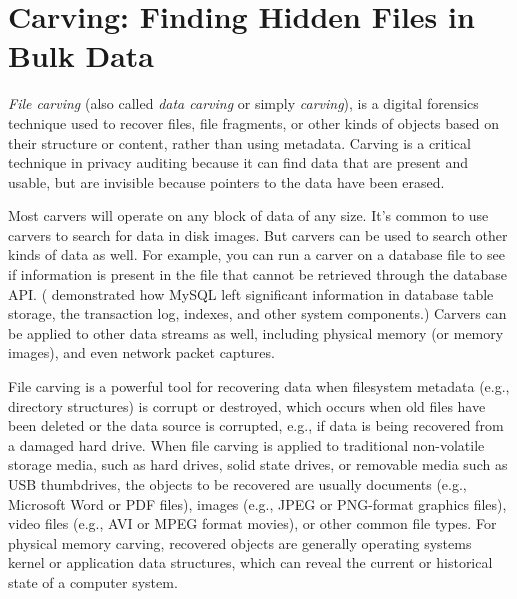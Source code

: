 \chapter{Carving: Finding Hidden Files in Bulk Data}

\emph{File carving} (also called \emph{data carving} or simply
\emph{carving}), is a digital forensics technique used to recover
files, file fragments, or other kinds of objects based on their
structure or content, rather than using metadata. Carving is a
critical technique in privacy auditing because it can find data that
are present and usable, but are invisible because pointers to the
data have been erased.

Most carvers will operate on any block of data of any size. It's
common to use carvers to search for data in disk images. But carvers
can be used to search other kinds of data as well. For example, you
can run a carver on a database file to see if information is present
in the file that cannot be retrieved through the database API.
( demonstrated how MySQL left significant information
in database table storage, the transaction log, indexes, and other
system components.) Carvers can be applied to other data streams as
well, including physical memory (or memory images), and even network
packet captures.

File carving is a powerful tool for recovering data when filesystem
metadata (e.g., directory structures) is corrupt or destroyed, which
occurs when old files have been deleted or the data source is
corrupted, e.g., if data is being recovered from a damaged hard drive.
When file carving is applied to traditional non-volatile storage
media, such as hard drives, solid state drives, or removable media
such as USB thumbdrives, the objects to be recovered are usually
documents (e.g., Microsoft Word or PDF files), images (e.g., JPEG or
PNG-format graphics files), video files (e.g., AVI or MPEG format
movies), or other common file types.  For physical memory carving,
recovered objects are generally operating systems kernel or
application data structures, which can reveal the current or
historical state of a computer system.


